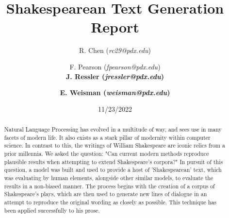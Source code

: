 \documentclass[11pt,a4paper]{article}
\title{Shakespearean Text Generation Report}
\author{  R. Chen (\textit{rc29@pdx.edu}) \and F. Pearson (\textit{fpearson@pdx.edu})\\ \textbf{J. Ressler (\textit{jressler@pdx.edu})} \and \textbf{E. Weisman (\textit{weisman@pdx.edu})}}
\begin{document}



\maketitle



\date{11/23/2022}

\begin{abstract}
Natural Language Processing has evolved in a multitude of way, and sees use in many facets of modern life. It also exists as a stark pillar of modernity within computer science. In contrast to this, the writings of William Shakespeare are iconic relics from a prior millennia. We asked the question: "Can current modern methods reproduce plausible results when attempting to extend Shakespeare's corpora?" In pursuit of this question, a model was built and used to provide a host of 'Shakespearean' text, which was evaluating by human elements, alongside other similar models, to evaluate the results in a non-biased manner. The process begins with the creation of a corpus of Shakespeare's plays, which are then used to generate new lines of dialogue in an attempt to reproduce the original wording as closely as possible. This technique has been applied successfully to his prose.

\end{abstract}
\end{document}
